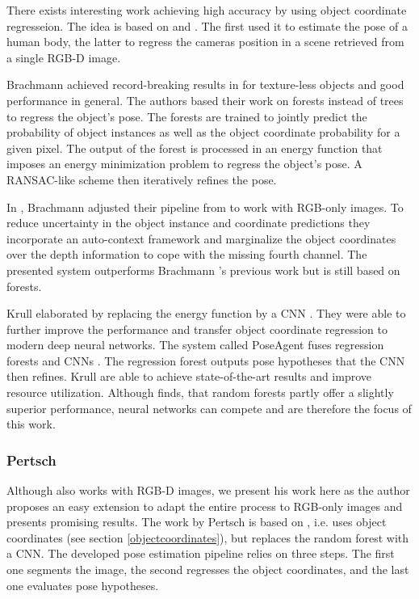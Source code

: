 There exists interesting work achieving high accuracy by using object coordinate regresseion. The idea is based on \cite{tsharp} and \cite{firstcoordinateregression}. The first used it to estimate the pose of a human body, the latter to regress the cameras position in a scene retrieved from a single RGB-D image.

Brachmann \etal achieved record-breaking results in \cite{brachmann1} for texture-less objects and good performance in general. The authors based their work on forests instead of trees to regress the object's pose. The forests are trained to jointly predict the probability of object instances as well as the object coordinate probability for a given pixel. The output of the forest is processed in an energy function that imposes an energy minimization problem to regress the object's pose. A RANSAC-like scheme then iteratively refines the pose.

In \cite{brachmann2}, Brachmann \etal adjusted their pipeline from \cite{brachmann1} to work with RGB-only images. To reduce uncertainty in the object instance and coordinate predictions they incorporate an auto-context framework and marginalize the object coordinates over the depth information to cope with the missing fourth channel. The presented system outperforms Brachmann \etal's previous work but is still based on forests. 

Krull \etal elaborated \cite{brachmann1} by replacing the energy function by a CNN \cite{akrull}. They were able to further improve the performance and transfer object coordinate regression to modern deep neural networks. The system called PoseAgent fuses regression forests and CNNs \cite{poseagent}. The regression forest outputs pose hypotheses that the CNN then refines. Krull \etal are able to achieve state-of-the-art results and improve resource utilization. Although \cite{trees-vs-cnn} finds, that random forests partly offer a slightly superior performance, neural networks can compete and are therefore the focus of this work.

\subsubsection{Pertsch}

Although \cite{pertsch} also works with RGB-D images, we present his work here as the author proposes an easy extension to adapt the entire process to RGB-only images and presents promising results. The work by Pertsch is based on \cite{brachmann1}, i.e. uses object coordinates  (see section \ref{objectcoordinates}), but replaces the random forest with a CNN. The developed pose estimation pipeline relies on three steps. The first one segments the image, the second regresses the object coordinates, and the last one evaluates pose hypotheses. 

